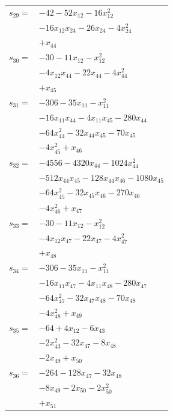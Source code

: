 \begin{longtable}{@{}r@{\;}l@{}}
\(s_{29}=\) & \(\displaystyle -42 -52x_{12} -16x_{12}^{2}\) \\
 & \(\displaystyle -16x_{12}x_{24} -26x_{24} -4x_{24}^{2}\) \\
 & \(\displaystyle +x_{44}\) \\[3pt]
\(s_{30}=\) & \(\displaystyle -30 -11x_{12} -x_{12}^{2}\) \\
 & \(\displaystyle -4x_{12}x_{44} -22x_{44} -4x_{44}^{2}\) \\
 & \(\displaystyle +x_{45}\) \\[3pt]
\(s_{31}=\) & \(\displaystyle -306 -35x_{11} -x_{11}^{2}\) \\
 & \(\displaystyle -16x_{11}x_{44} -4x_{11}x_{45} -280x_{44}\) \\
 & \(\displaystyle -64x_{44}^{2} -32x_{44}x_{45} -70x_{45}\) \\
 & \(\displaystyle -4x_{45}^{2} +x_{46}\) \\[3pt]
\(s_{32}=\) & \(\displaystyle -4556 -4320x_{44} -1024x_{44}^{2}\) \\
 & \(\displaystyle -512x_{44}x_{45} -128x_{44}x_{46} -1080x_{45}\) \\
 & \(\displaystyle -64x_{45}^{2} -32x_{45}x_{46} -270x_{46}\) \\
 & \(\displaystyle -4x_{46}^{2} +x_{47}\) \\[3pt]
\(s_{33}=\) & \(\displaystyle -30 -11x_{12} -x_{12}^{2}\) \\
 & \(\displaystyle -4x_{12}x_{47} -22x_{47} -4x_{47}^{2}\) \\
 & \(\displaystyle +x_{48}\) \\[3pt]
\(s_{34}=\) & \(\displaystyle -306 -35x_{11} -x_{11}^{2}\) \\
 & \(\displaystyle -16x_{11}x_{47} -4x_{11}x_{48} -280x_{47}\) \\
 & \(\displaystyle -64x_{47}^{2} -32x_{47}x_{48} -70x_{48}\) \\
 & \(\displaystyle -4x_{48}^{2} +x_{49}\) \\[3pt]
\(s_{35}=\) & \(\displaystyle -64 +4x_{12} -6x_{43}\) \\
 & \(\displaystyle -2x_{43}^{2} -32x_{47} -8x_{48}\) \\
 & \(\displaystyle -2x_{49} +x_{50}\) \\[3pt]
\(s_{36}=\) & \(\displaystyle -264 -128x_{47} -32x_{48}\) \\
 & \(\displaystyle -8x_{49} -2x_{50} -2x_{50}^{2}\) \\
 & \(\displaystyle +x_{51}\) \\[3pt]

\end{longtable}

